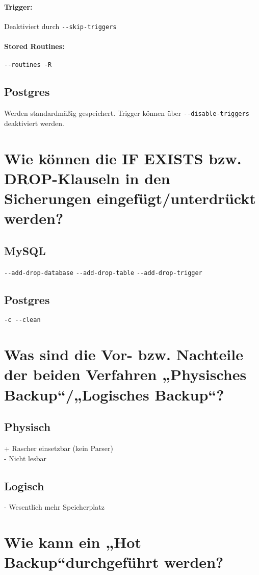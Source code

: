 \documentclass{school}
\begin{document}
\paragraph{Trigger: } Deaktiviert durch \verb|--skip-triggers|
\paragraph{Stored Routines: }\verb|--routines -R|

\subsection{Postgres}
Werden standardmäßig gespeichert. Trigger können über \verb|--disable-triggers| deaktiviert werden.

\section{Wie können die IF EXISTS bzw. DROP-Klauseln in den Sicherungen eingefügt/unterdrückt werden?}
\subsection{MySQL}
\verb|--add-drop-database|
\verb|--add-drop-table|
\verb|--add-drop-trigger|

\subsection{Postgres}
\verb|-c --clean|

\newpage
\section{Was sind die Vor- bzw. Nachteile der beiden Verfahren „Physisches Backup“/„Logisches Backup“?}
\subsection{Physisch}
+ Rascher einsetzbar (kein Parser)\\
- Nicht lesbar
\subsection{Logisch}
- Wesentlich mehr Speicherplatz

\section{Wie kann ein „Hot Backup“durchgeführt werden?}
\end{document}
